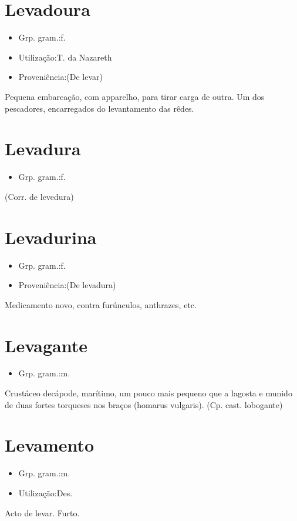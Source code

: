 \section{Levadoura}
\begin{itemize}
\item {Grp. gram.:f.}
\end{itemize}
\begin{itemize}
\item {Utilização:T. da Nazareth}
\end{itemize}
\begin{itemize}
\item {Proveniência:(De \textunderscore levar\textunderscore )}
\end{itemize}
Pequena embarcação, com apparelho, para tirar carga de outra.
Um dos pescadores, encarregados do levantamento das rêdes.
\section{Levadura}
\begin{itemize}
\item {Grp. gram.:f.}
\end{itemize}
(Corr. de \textunderscore levedura\textunderscore )
\section{Levadurina}
\begin{itemize}
\item {Grp. gram.:f.}
\end{itemize}
\begin{itemize}
\item {Proveniência:(De \textunderscore levadura\textunderscore )}
\end{itemize}
Medicamento novo, contra furúnculos, anthrazes, etc.
\section{Levagante}
\begin{itemize}
\item {Grp. gram.:m.}
\end{itemize}
Crustáceo decápode, marítimo, um pouco mais pequeno que a lagosta e munido de duas fortes torqueses nos braços (\textunderscore homarus vulgaris\textunderscore ).
(Cp. cast. \textunderscore lobogante\textunderscore )
\section{Levamento}
\begin{itemize}
\item {Grp. gram.:m.}
\end{itemize}
\begin{itemize}
\item {Utilização:Des.}
\end{itemize}
Acto de levar.
Furto.
